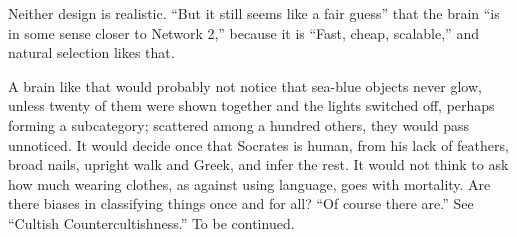 Neither design is realistic. ``But it still seems like a fair guess'' that the brain ``is in some sense closer to Network 2,'' because it is ``Fast, cheap, scalable,'' and natural selection likes that. 

A brain like that would probably not notice that sea-blue objects never glow, unless twenty of them were shown together and the lights switched off, perhaps forming a subcategory; scattered among a hundred others, they would pass unnoticed. It would decide once that Socrates is human, from his lack of feathers, broad nails, upright walk and Greek, and infer the rest. It would not think to ask how much wearing clothes, as against using language, goes with mortality. Are there biases in classifying things once and for all? ``Of course there are.'' See ``Cultish Countercultishness.'' To be continued. 
